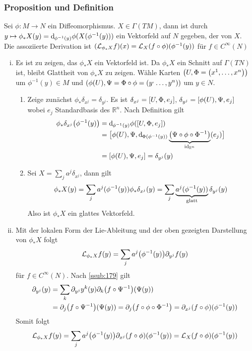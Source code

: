 \subsubsection[Proposition und Definition: Push-Forward]{Proposition und Definition}
\label{ssub:163}
Sei $\phi:M\to N$ ein Diffeomorphismus. $X\in \Gamma(TM)$, dann ist durch $y\mapsto \phi_{*} X(y) = \mathd_{\phi^{-1}(y)} \phi\enbrace{X(\phi^{-1}(y))}$ ein Vektorfeld auf $N$ gegeben, der  von $X$. Die assoziierte Derivation ist $\enbrace{\mathcal{L}_{\phi_* X} f}(x) = \mathcal{L}_X (f\circ \phi)(\phi^{-1}(y))$ für $f\in C^\infty (N)$
\begin{enumerate}[(i)]
\item Es ist zu zeigen, das $\phi_* X$ ein Vektorfeld ist. Da $\phi_* X$ ein Schnitt auf $\Gamma(TN)$ ist, bleibt Glattheit von $\phi_* X$ zu zeigen. Wähle Karten $\enbrace*{U, \Phi = \enbrace*{x^1,\ldots,x^n}}$ um $\phi^{-1}(y)\in M$ und $\enbrace*{\phi(U),\Psi = \Phi \circ \phi = \enbrace*{y^,\ldots,y^n}}$ um $y\in N$.
\begin{enumerate}[Step 1:]
\item Zeige zunächst $\phi_* \delta_{x^j} = \delta_{y^j}$. Es ist $\delta_{x^j} = \benbrace{U,\Phi,e_j}$, $\delta_{y^j} = \benbrace{\phi(U),\Psi,e_j}$ wobei $e_j$ Standardbasis des $\mathds{R}^n$. Nach Definition gilt
\begin{align*}
\phi_* \delta_{x^j}\enbrace*{\phi^{-1}(y)} &= \mathd_{\phi^{-1} (y)} \phi\enbrace*{\benbrace*{U,\Phi,e_j}}\\
&= \benbrace[\big]{\phi(U),\Psi, \mathd_{\Phi\enbrace*{\phi^{-1}(y)}} \underbrace{\enbrace*{\Psi \circ \phi \circ \Phi^{-1}}}_{\id_{\mathds{R}^n}}(e_j)}\\
&= \benbrace{\phi(U),\Psi,e_j} = \delta_{y^j}(y)
\end{align*}
\item Sei $X = \sum_j a^j \delta_{x^j}$, dann gilt
\[
\phi_* X(y) = \sum_j a^j(\phi^{-1}(y))\phi_* \delta_{x^j}(y) = \sum_j \underbrace{a^j\enbrace{\phi^{-1}(y)}}_{\text{glatt}} \delta_{y^j} (y)
\]
Also ist $\phi_* X$ ein glattes Vektorfeld.
\end{enumerate}
\item Mit der lokalen Form der Lie-Ableitung und der oben gezeigten Darstellung von $\phi_* X$ folgt
\[
\mathcal{L}_{\phi_* X} f(y) = \sum_j a^j\enbrace*{\phi^{-1}(y)} \partial_{y^j} f(y)
\]
für $f\in C^\infty (N)$. Nach \ref{ssub:179} gilt
\begin{align*}
\partial_{y^j}(y) &= \sum_k \partial_{y^j}y^k(y)\partial_k \enbrace*{f\circ \Psi^{-1}}(\Psi(y))\\
&= \partial_j \enbrace*{f\circ \Psi^{-1}}(\Psi(y)) = \partial_j \enbrace*{f\circ \phi\circ \Phi^{-1}} = \partial_{x^j}(f\circ \phi)(\phi^{-1}(y))
\end{align*}
Somit folgt
\[
\mathcal{L}_{\phi_* X} f(y) = \sum_j a^j \enbrace*{\phi^{-1}(y)}\partial_{x^j}(f\circ \phi) (\phi^{-1}(y)) = \mathcal{L}_X (f\circ \phi)(\phi^{-1}(y))
\]
\end{enumerate}

